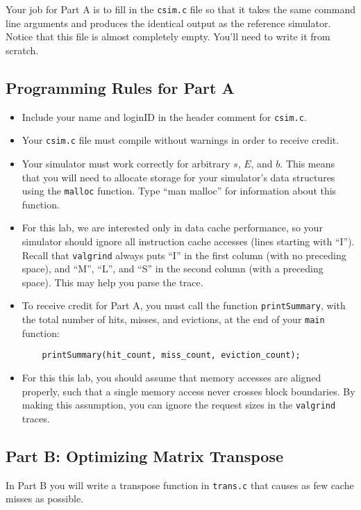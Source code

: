 \documentclass[11pt]{article}
\begin{document}
Your job for Part A is to fill in the {\tt csim.c} file so that
it takes the same command line arguments and produces the identical
output as the reference simulator. Notice that this file is almost
completely empty. You'll need to write it from scratch.

\subsection*{Programming Rules for Part A}

\begin{itemize}
\item Include your name and loginID in the header comment for {\tt csim.c}.

\item Your {\tt csim.c} file must compile without warnings in order
  to receive credit.

\item Your simulator must work correctly for arbitrary $s$, $E$, and
  $b$. This means that you will need to allocate storage for your
  simulator's data structures using the \verb:malloc: function. Type ``man
  malloc'' for information about this function. 

\item For this lab, we are interested only in data cache performance,
  so your simulator should ignore all instruction cache accesses
  (lines starting with ``I''). Recall that {\tt valgrind} always puts
  ``I'' in the first column (with no preceding space), and ``M'',
  ``L'', and ``S'' in the second column (with a preceding space). This
  may help you parse the trace.

\item To receive credit for Part A,
  you must call the function {\tt printSummary}, with the total number
  of hits, misses, and evictions, at the end of your {\tt main}
  function:
\begin{verbatim}
    printSummary(hit_count, miss_count, eviction_count);
\end{verbatim}

\item For this this lab, you should assume that memory
  accesses are aligned properly, such that a single memory access
  never crosses block boundaries. By making this assumption, you can
  ignore the request sizes in the {\tt valgrind} traces.

\end{itemize}

\subsection{Part B: Optimizing Matrix Transpose}
In Part B you will write a transpose function in {\tt trans.c} that
causes as few cache misses as possible.
\end{document}
